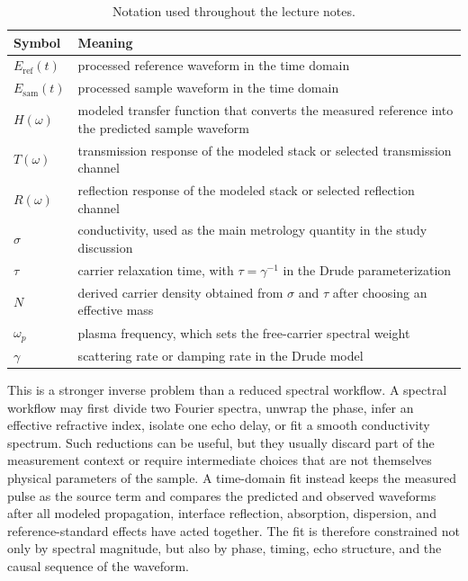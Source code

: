 \documentclass[11pt]{article}
\newcommand{\eref}{E_{\mathrm{ref}}}
\newcommand{\esam}{E_{\mathrm{sam}}}
\begin{document}
\begin{table}[htbp]
\centering
\caption{Notation used throughout the lecture notes.}
\label{tab:notation-used-throughout}
\small
\begin{tabularx}{\linewidth}{@{}lY@{}}
\toprule
Symbol & Meaning \\
\midrule
\(\eref(t)\) & processed reference waveform in the time domain \\
\(\esam(t)\) & processed sample waveform in the time domain \\
\(H(\omega)\) & modeled transfer function that converts the measured reference into the predicted sample waveform \\
\(T(\omega)\) & transmission response of the modeled stack or selected transmission channel \\
\(R(\omega)\) & reflection response of the modeled stack or selected reflection channel \\
\(\sigma\) & conductivity, used as the main metrology quantity in the study discussion \\
\(\tau\) & carrier relaxation time, with \(\tau=\gamma^{-1}\) in the Drude parameterization \\
\(N\) & derived carrier density obtained from \(\sigma\) and \(\tau\) after choosing an effective mass \\
\(\omega_p\) & plasma frequency, which sets the free-carrier spectral weight \\
\(\gamma\) & scattering rate or damping rate in the Drude model \\
\bottomrule
\end{tabularx}
\end{table}

This is a stronger inverse problem than a reduced spectral workflow. A spectral workflow may first divide two Fourier spectra, unwrap the phase, infer an effective refractive index, isolate one echo delay, or fit a smooth conductivity spectrum. Such reductions can be useful, but they usually discard part of the measurement context or require intermediate choices that are not themselves physical parameters of the sample. A time-domain fit instead keeps the measured pulse as the source term and compares the predicted and observed waveforms after all modeled propagation, interface reflection, absorption, dispersion, and reference-standard effects have acted together. The fit is therefore constrained not only by spectral magnitude, but also by phase, timing, echo structure, and the causal sequence of the waveform.
\end{document}
